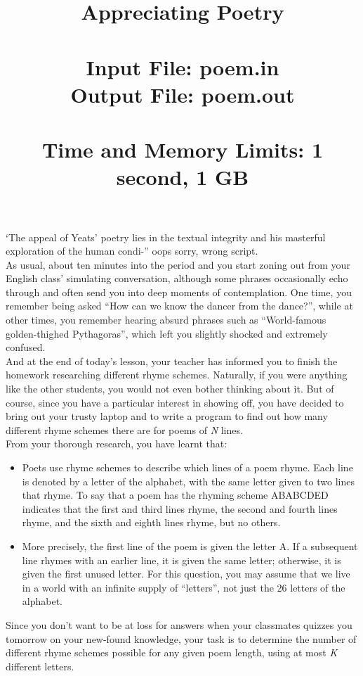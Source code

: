 \documentclass{article}
\title{\textbf{Appreciating Poetry} \\
	\ \\
	\large \textbf{Input File:} poem.in \\
	\large \textbf{Output File:} poem.out \\
	\ \\
	\textbf{Time and Memory Limits:} 1 second, 1 GB}
\date{\vspace{-10ex}}
\begin{document}
\maketitle
	
‘The appeal of Yeats’ poetry lies in the textual integrity and his masterful exploration of the human condi-” oops sorry, wrong script. \\

As usual, about ten minutes into the period and you start zoning out from your English class’ simulating conversation, although some phrases occasionally echo through and often send you into deep moments of contemplation. One time, you remember being asked “How can we know the dancer from the dance?”, while at other times, you remember hearing absurd phrases such as “World-famous golden-thighed Pythagoras”, which left you slightly shocked and extremely confused. \\

And at the end of today’s lesson, your teacher has informed you to finish the homework researching different rhyme schemes. Naturally, if you were anything like the other students, you would not even bother thinking about it. But of course, since you have a particular interest in showing off, you have decided to bring out your trusty laptop and to write a program to find out how many different rhyme schemes there are for poems of \emph{N} lines. \\

From your thorough research, you have learnt that:
\begin{itemize}
	\item Poets use rhyme schemes to describe which lines of a poem rhyme. Each line is denoted by a letter of the alphabet, with the same letter given to two lines that rhyme. To say that a poem has the rhyming scheme ABABCDED indicates that the first and third lines rhyme, the second and fourth lines rhyme, and the sixth and eighth lines rhyme, but no others. 
	
	\item More precisely, the first line of the poem is given the letter A. If a subsequent line rhymes with an earlier line, it is given the same letter; otherwise, it is given the first unused letter. For this question, you may assume that we live in a world with an infinite supply of “letters”, not just the 26 letters of the alphabet. \\
\end{itemize}

Since you don't want to be at loss for answers when your classmates quizzes you tomorrow on your new-found knowledge, your task is to determine the number of different rhyme schemes possible for any given poem length, using at most \emph{K} different letters. \\
\end{document}
